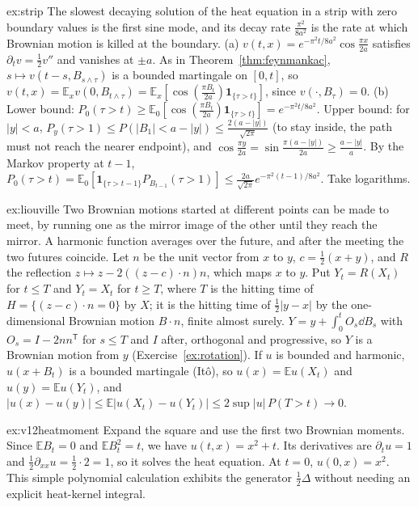 \begin{solution}{ex:strip}
\idea The slowest decaying solution of the heat equation in a strip with zero boundary values is the first sine mode, and its decay rate $\frac{\pi^2}{8a^2}$ is the rate at which Brownian motion is killed at the boundary.
\writeup (a) $v(t,x)=e^{-\pi^2t/8a^2}\cos\frac{\pi x}{2a}$ satisfies $\partial_tv=\frac12v''$ and vanishes at $\pm a$. As in Theorem~\ref{thm:feynmankac}, $s\mapsto v(t-s,B_{s\wedge\tau})$ is a bounded martingale on $[0,t]$, so
$v(t,x)=\mathbb E_xv(0,B_{t\wedge\tau})=\mathbb E_x[\cos(\frac{\pi B_t}{2a})\mathbf 1_{\{\tau>t\}}]$, since $v(\cdot,B_\tau)=0$. (b) Lower bound: $P_0(\tau>t)\ge\mathbb E_0[\cos(\frac{\pi B_t}{2a})\mathbf 1_{\{\tau>t\}}]=e^{-\pi^2t/8a^2}$. Upper
bound: for $|y|<a$, $P_y(\tau>1)\le P(|B_1|<a-|y|)\le\frac{2(a-|y|)}{\sqrt{2\pi}}$ (to stay inside, the path must not reach the nearer endpoint), and $\cos\frac{\pi y}{2a}=\sin\frac{\pi(a-|y|)}{2a}\ge\frac{a-|y|}a$. By the Markov
property at $t-1$, $P_0(\tau>t)=\mathbb E_0[\mathbf 1_{\{\tau>t-1\}}P_{B_{t-1}}(\tau>1)]\le\frac{2a}{\sqrt{2\pi}}e^{-\pi^2(t-1)/8a^2}$. Take logarithms.
\end{solution}

\begin{solution}{ex:liouville}
\idea Two Brownian motions started at different points can be made to meet, by running one as the mirror image of the other until they reach the mirror. A harmonic function averages over the future, and after
the meeting the two futures coincide.
\writeup Let $n$ be the unit vector from $x$ to $y$, $c=\frac12(x+y)$, and $R$ the reflection $z\mapsto z-2((z-c)\cdot n)n$, which maps $x$ to $y$. Put $Y_t=R(X_t)$ for $t\le T$ and $Y_t=X_t$ for $t\ge T$, where $T$ is the hitting time
of $H=\{(z-c)\cdot n=0\}$ by $X$; it is the hitting time of $\frac12|y-x|$ by the one-dimensional Brownian motion $B\cdot n$, finite almost surely. $Y=y+\int_0^tO_s\dd B_s$ with $O_s=I-2nn^{\mathsf T}$ for $s\le T$ and $I$ after,
orthogonal and progressive, so $Y$ is a Brownian motion from $y$ (Exercise~\ref{ex:rotation}). If $u$ is bounded and harmonic, $u(x+B_t)$ is a bounded martingale (It\^o), so $u(x)=\mathbb Eu(X_t)$ and $u(y)=\mathbb Eu(Y_t)$, and
$|u(x)-u(y)|\le\mathbb E|u(X_t)-u(Y_t)|\le2\sup|u|\,P(T>t)\to0$.
\end{solution}

\begin{solution}{ex:v12heatmoment}
\idea Expand the square and use the first two Brownian moments.
\writeup Since $\mathbb EB_t=0$ and $\mathbb EB_t^2=t$, we have $u(t,x)=x^2+t$. Its derivatives are $\partial_tu=1$ and $\frac12\partial_{xx}u=\frac12\cdot2=1$, so it solves the heat equation. At $t=0$, $u(0,x)=x^2$. This simple polynomial calculation exhibits the generator $\frac12\Delta$ without needing an explicit heat-kernel integral.
\end{solution}

